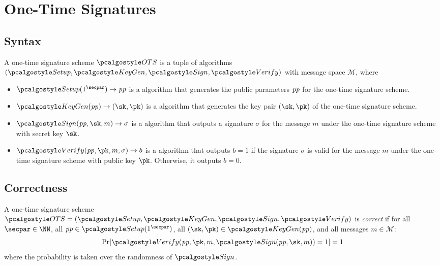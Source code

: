\section{One-Time Signatures}\label{sec:one-time-sigs}

\subsection{Syntax}

\begin{definition}
    A one-time signature scheme $\algo{OTS}$ is a tuple of \ppt algorithms $(\algo{Setup}, \algo{KeyGen}, \algo{Sign}, \algo{Verify})$ with message space $\mathcal{M}$, where
    \begin{itemize}
        \item $\algo{Setup}(1^\secpar)\rightarrow \params$ is a \ppt algorithm that generates the public parameters $\mathit{pp}$ for the one-time signature scheme.
        \item $\algo{KeyGen}(\params)\rightarrow (\sk, \pk)$ is a \ppt algorithm that generates the key pair $(\sk, \pk)$ of the one-time signature scheme.
        \item $\algo{Sign}(\params, \sk, m) \rightarrow \sigma$ is a \ppt algorithm that outputs a signature $\sigma$ for the message $m$ under the one-time signature scheme with secret key $\sk$.
        \item $\algo{Verify}(\params, \pk, m, \sigma) \rightarrow b$ is a \ppt algorithm that outputs $b = 1$ if the signature $\sigma$ is valid for the message $m$ under the one-time signature scheme with public key $\pk$. Otherwise, it outputs $b = 0$.
    \end{itemize}
\end{definition}


\subsection{Correctness}

\begin{definition}[Correctness]\label{def:ots-correctness}
  A one-time signature scheme $\algo{OTS} = (\algo{Setup}, \algo{KeyGen}, \algo{Sign}, \algo{Verify})$ is \emph{correct} if for all $\secpar \in \NN$, all $\params \in \algo{Setup}(1^\secpar)$, all $(\sk, \pk) \in \algo{KeyGen}(\params)$, and all messages $m \in \mathcal{M}$:
  \[
    \Pr[\algo{Verify}(\params, \pk, m, \algo{Sign}(\params, \sk, m)) = 1] = 1
  \]
  where the probability is taken over the randomness of $\algo{Sign}$.
\end{definition}

